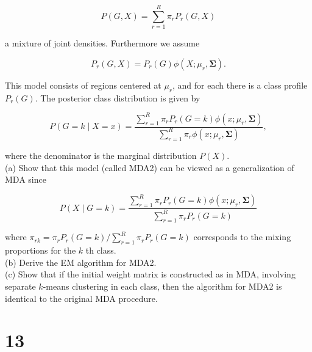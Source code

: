 \documentclass[10pt]{article}
\begin{document}
\begin{equation*}
P(G, X)=\sum_{r=1}^{R} \pi_{r} P_{r}(G, X) \tag{12.67}
\end{equation*}


a mixture of joint densities. Furthermore we assume


\begin{equation*}
P_{r}(G, X)=P_{r}(G) \phi\left(X ; \mu_{r}, \boldsymbol{\Sigma}\right) . \tag{12.68}
\end{equation*}


This model consists of regions centered at $\mu_{r}$, and for each there is a class profile $P_{r}(G)$. The posterior class distribution is given by


\begin{equation*}
P(G=k \mid X=x)=\frac{\sum_{r=1}^{R} \pi_{r} P_{r}(G=k) \phi\left(x ; \mu_{r}, \boldsymbol{\Sigma}\right)}{\sum_{r=1}^{R} \pi_{r} \phi\left(x ; \mu_{r}, \boldsymbol{\Sigma}\right)}, \tag{12.69}
\end{equation*}


where the denominator is the marginal distribution $P(X)$.\\
(a) Show that this model (called MDA2) can be viewed as a generalization of MDA since


\begin{equation*}
P(X \mid G=k)=\frac{\sum_{r=1}^{R} \pi_{r} P_{r}(G=k) \phi\left(x ; \mu_{r}, \boldsymbol{\Sigma}\right)}{\sum_{r=1}^{R} \pi_{r} P_{r}(G=k)} \tag{12.70}
\end{equation*}


where $\pi_{r k}=\pi_{r} P_{r}(G=k) / \sum_{r=1}^{R} \pi_{r} P_{r}(G=k)$ corresponds to the mixing proportions for the $k$ th class.\\
(b) Derive the EM algorithm for MDA2.\\
(c) Show that if the initial weight matrix is constructed as in MDA, involving separate $k$-means clustering in each class, then the algorithm for MDA2 is identical to the original MDA procedure.

\section*{13}
\end{document}
